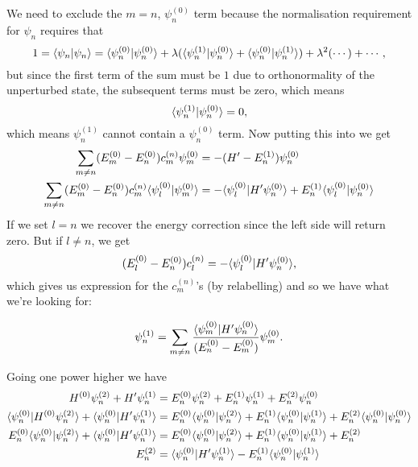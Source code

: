 We need to exclude the $m=n$, \ie $\psi^{(0)}_n$ term because the normalisation 
requirement for $\psi_n$ requires that
\begin{equation}
1=\langle \psi_n|\psi_n\rangle=\langle \psi^{(0)}_n |\psi^{(0)}_n\rangle+\lambda(\langle\psi^{(1)}_n|\psi^{(0)}_n\rangle+\langle \psi^{(0)}_n|\psi^{(1)}_n\rangle)+\lambda^2(\cdots)+\cdots,
\end{equation}
but since the first term of the sum must be $1$ due to orthonormality of the 
unperturbed state, the subsequent terms must be zero, which means 
\begin{equation}
\label{pertorth}
\langle \psi^{(1)}_n|\psi^{(0)}_n\rangle=0, 
\end{equation}
which means $\psi^{(1)}_n$ cannot contain a $\psi^{(0)}_n$ term. Now putting this 
into  we get
\begin{equation}
\begin{aligned}
\sum_{m\neq n}(E_m^{(0)}-E_n^{(0)})c_m^{(n)}\psi_m^{(0)}&=-(H'-E_n^{(1)})\psi_n^{(0)}\\
\sum_{m\neq n}(E_m^{(0)}-E_n^{(0)})c_m^{(n)}\langle\psi_l^{(0)}|\psi_m^{(0)}\rangle&=-\langle\psi_l^{(0)}|H'\psi_n^{(0)}\rangle+E_n^{(1)}\langle\psi_l^{(0)}|\psi_n^{(0)}\rangle
\end{aligned}
\end{equation}
If we set $l=n$ we recover the energy correction since the left side will return 
zero. But if $l\neq n$, we get
\begin{equation}
(E_l^{(0)}-E_n^{(0)})c_l^{(n)}=-\langle\psi_l^{(0)} |H'\psi_n^{(0)} \rangle, 
\end{equation}
which gives us expression for the $c_m^{(n)}$'s (by relabelling) and so we have what we're looking for: 
\begin{thrm}
\begin{equation}
\psi_n^{(1)}=\sum_{m\neq n}\frac{\langle\psi_m^{(0)} |H'\psi_n^{(0)} \rangle}{(E_n^{(0)}-E_m^{(0)})}\psi_m^{(0)}.
\end{equation}
\end{thrm}
Going one power higher we have
\begin{equation}
\begin{aligned}
H^{(0)}\psi_n^{(2)}+H'\psi_n^{(1)}&=E_n^{(0)}\psi_n^{(2)}+E_n^{(1)}\psi_n^{(1)}+E_n^{(2)}\psi_n^{(0)}\\
\langle\psi_n^{(0)}|H^{(0)}\psi_n^{(2)}\rangle+\langle\psi_n^{(0)}|H'\psi_n^{(1)}\rangle&=E_n^{(0)}\langle\psi_n^{(0)}|\psi_n^{(2)}\rangle+E_n^{(1)}\langle\psi_n^{(0)}|\psi_n^{(1)}\rangle+E_n^{(2)}\langle\psi_n^{(0)}|\psi_n^{(0)}\rangle\\
E_n^{(0)}\langle\psi_n^{(0)}|\psi_n^{(2)}\rangle+\langle\psi_n^{(0)}|H'\psi_n^{(1)}\rangle&=E_n^{(0)}\langle\psi_n^{(0)}|\psi_n^{(2)}\rangle+E_n^{(1)}\langle\psi_n^{(0)}|\psi_n^{(1)}\rangle+E_n^{(2)}\\
E_n^{(2)}&=\langle\psi_n^{(0)}|H'\psi_n^{(1)}\rangle-E_n^{(1)}\langle\psi_n^{(0)}|\psi_n^{(1)}\rangle
\end{aligned}
\end{equation}
